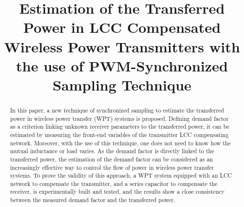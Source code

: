 \documentclass[journal,a4paper]{IEEEtran}
\begin{document}
\title{Estimation of the Transferred Power in LCC Compensated Wireless Power Transmitters with the use of PWM-Synchronized Sampling Technique}

        




\maketitle

\begin{abstract}
In this paper, a new technique of synchronized sampling to estimate the transferred power in wireless power transfer (WPT) systems is proposed. Defining demand factor as a criterion linking unknown receiver parameters to the transferred power, it can be estimated by measuring the front-end variables of the transmitter LCC compensating network. Moreover, with the use of this technique, one does not need to know how the mutual inductance or load varies. As the demand factor is directly linked to the transferred power, the estimation of the demand factor can be considered as an increasingly effective way to control the flow of power in wireless power transfer systems. To prove the validity of this approach, a WPT system equipped with an LCC network to compensate the transmitter, and a series capacitor to compensate the receiver, is experimentally built and tested, and the results show a close consistency between the measured demand factor and the transferred power.  
\end{abstract}
\end{document}
